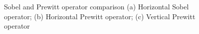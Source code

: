 \documentclass[twoside,a4paper,article]{combine}
\begin{document}
\begin{minipage}{\textwidth}\begin{figure}[H]
    \centering
    \caption{Sobel and Prewitt operator comparison (a) Horizontal Sobel operator; 
    (b) Horizontal Prewitt operator; (c) Vertical Prewitt operator}\label{fig:prewittSobel}
\end{figure}\end{minipage}
\end{document}
